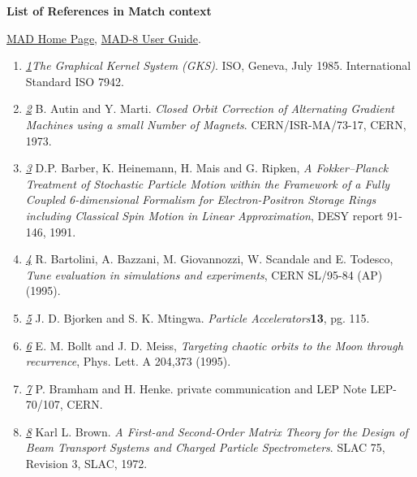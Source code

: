 

{\bf List of References in Match context}


\href{http://cern.ch/mad}{MAD Home Page}, \href{http://cern.ch/mad8/user/mad.html}{MAD-8 User Guide}. 


\begin{enumerate}
   \item \href{gks}{\textit{1}}\textit{The Graphical Kernel System
     (GKS)}. ISO, Geneva, July 1985. International Standard ISO 7942.  

   \item \href{autin}{\textit{2}} B. Autin and Y. Marti. \textit{Closed
     Orbit Correction of Alternating Gradient Machines   using a small
     Number of Magnets}. CERN/ISR-MA/73-17, CERN, 1973.  


   \item \href{barber}{\textit{3}} D.P. Barber, K. Heinemann, H. Mais
     and G. Ripken, \textit{A Fokker--Planck Treatment of Stochastic
       Particle Motion within   the Framework of a Fully Coupled
       6-dimensional Formalism for   Electron-Positron Storage Rings
       including Classical Spin Motion in   Linear Approximation}, DESY
     report 91-146, 1991.  


   \item \href{bartolini}{\textit{4}} R. Bartolini, A. Bazzani,
     M. Giovannozzi, W. Scandale and E. Todesco, \textit{Tune evaluation
       in simulations and experiments}, CERN SL/95-84 (AP) (1995).  


   \item \href{bjorken}{\textit{5}} J. D. Bjorken and
     S. K. Mtingwa. \textit{Particle Accelerators}\textbf{13}, pg. 115.  


   \item \href{moon}{\textit{6}} E. M. Bollt and J. D. Meiss,
     \textit{Targeting chaotic orbits to the Moon through recurrence},
     Phys. Lett. A 204,373 (1995).  


   \item \href{bramham}{\textit{7}} P. Bramham and H. Henke. private
     communication and LEP Note LEP-70/107, CERN.  


   \item \href{slac75}{\textit{8}} Karl L. Brown. \textit{A First-and
     Second-Order Matrix Theory for the Design   of Beam Transport
     Systems and Charged Particle Spectrometers}. SLAC 75, Revision 3,
     SLAC, 1972.  


\end{enumerate}
